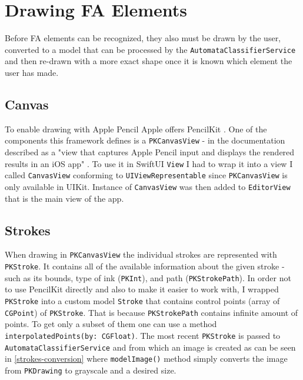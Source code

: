 \section{Drawing FA Elements}

Before FA elements can be recognized, they also must be drawn by the user, converted to a model that can be processed by the \lstinline{AutomataClassifierService} and then re-drawn with a more exact shape once it is known which element the user has made.

\subsection{Canvas}

To enable drawing with Apple Pencil Apple offers PencilKit \cite{pencilkit}. One of the components this framework defines is a \lstinline{PKCanvasView} - in the documentation described as a "view that captures Apple Pencil input and displays the rendered results in an iOS app" \cite{pkcanvasview}. To use it in SwiftUI \lstinline{View} I had to wrap it into a view I called \lstinline{CanvasView} conforming to \lstinline{UIViewRepresentable} since \lstinline{PKCanvasView} is only available in UIKit. Instance of \lstinline{CanvasView} was then added to \lstinline{EditorView} that is the main view of the app.

\subsection{Strokes}

When drawing in \lstinline{PKCanvasView} the individual strokes are represented with \lstinline{PKStroke}. It contains all of the available information about the given stroke - such as its bounds, type of ink (\lstinline{PKInt}), and path (\lstinline{PKStrokePath}). In order not to use PencilKit directly and also to make it easier to work with, I wrapped \lstinline{PKStroke} into a custom model \lstinline{Stroke} that contains control points (array of \lstinline{CGPoint}) of \lstinline{PKStroke}. That is because \lstinline{PKStrokePath} contains infinite amount of points. To get only a subset of them one can use a method \lstinline{interpolatedPoints(by: CGFloat)}. The most recent \lstinline{PKStroke} is passed to \lstinline{AutomataClassifierService} and from which an image is created as can be seen in \ref{strokes-conversion} where \lstinline{modelImage()} method simply converts the image from \lstinline{PKDrawing} to grayscale and a desired size.

